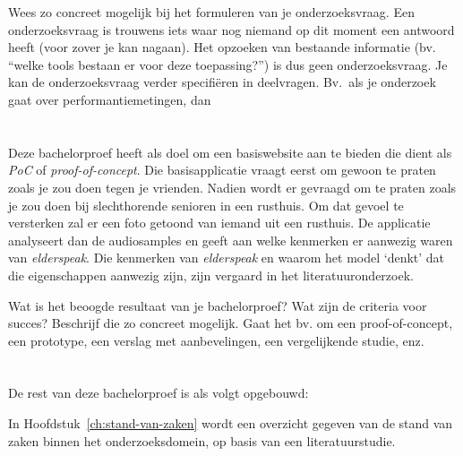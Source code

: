 \color{blue}
Wees zo concreet mogelijk bij het formuleren van je onderzoeksvraag. Een onderzoeksvraag is trouwens iets waar nog niemand op dit moment een antwoord heeft (voor zover je kan nagaan). Het opzoeken van bestaande informatie (bv. ``welke tools bestaan er voor deze toepassing?'') is dus geen onderzoeksvraag. Je kan de onderzoeksvraag verder specifiëren in deelvragen. Bv.~als je onderzoek gaat over performantiemetingen, dan
\color{black}

\section{}
\label{sec:onderzoeksdoelstelling}

Deze bachelorproef heeft als doel om een basiswebsite aan te bieden die dient als \textit{PoC} of \textit{proof-of-concept}. Die basisapplicatie vraagt eerst om gewoon te praten zoals je zou doen tegen je vrienden. Nadien wordt er gevraagd om te praten zoals je zou doen bij slechthorende senioren in een rusthuis. Om dat gevoel te versterken zal er een foto getoond van iemand uit een rusthuis. De applicatie analyseert dan de audiosamples en geeft aan welke kenmerken er aanwezig waren van \textit{elderspeak}. Die kenmerken van \textit{elderspeak} en waarom het model `denkt' dat die eigenschappen aanwezig zijn, zijn vergaard in het literatuuronderzoek.

\color{blue}
Wat is het beoogde resultaat van je bachelorproef? Wat zijn de criteria voor succes? Beschrijf die zo concreet mogelijk. Gaat het bv. om een proof-of-concept, een prototype, een verslag met aanbevelingen, een vergelijkende studie, enz.
\color{black}


\section{}
\label{sec:opzet-bachelorproef}


De rest van deze bachelorproef is als volgt opgebouwd:

In Hoofdstuk~\ref{ch:stand-van-zaken} wordt een overzicht gegeven van de stand van zaken binnen het onderzoeksdomein, op basis van een literatuurstudie.

